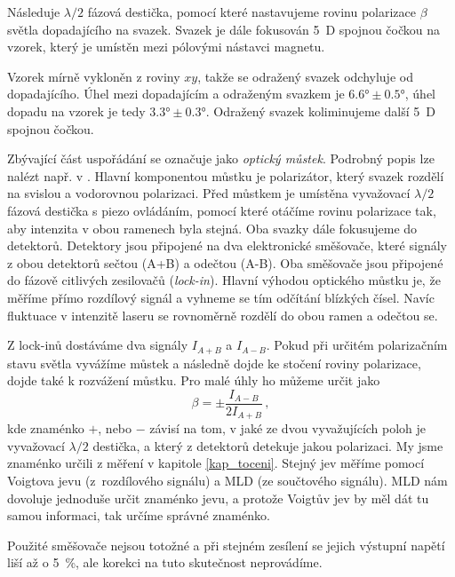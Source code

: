 Následuje $\lambda/2$ fázová destička, pomocí které nastavujeme rovinu polarizace $\beta$ světla dopadajícího na svazek. Svazek je dále fokusován \SI{5}{D} spojnou čočkou na vzorek, který je umístěn mezi pólovými nástavci magnetu. 

Vzorek mírně vykloněn z roviny $xy$, takže se odražený svazek odchyluje od dopadajícího. Úhel mezi dopadajícím a odraženým svazkem je $\ang{6,6}\pm\ang{0,5}$, úhel dopadu na vzorek je tedy $\ang{3,3}\pm\ang{0,3}$.
Odražený svazek koliminujeme další \SI{5}{D} spojnou čočkou.

Zbývající část uspořádání se označuje jako \emph{optický můstek}. Podrobný popis lze nalézt např. v \cite{Rozkotova}. Hlavní komponentou můstku je polarizátor, který svazek rozdělí na svislou a vodorovnou polarizaci. Před můstkem je umístěna vyvažovací $\lambda/2$ fázová destička s piezo ovládáním, pomocí které otáčíme rovinu polarizace tak, aby intenzita v obou ramenech byla stejná. Oba svazky dále fokusujeme do detektorů.
Detektory jsou připojené na dva elektronické směšovače, které signály z obou detektorů sečtou (A+B) a odečtou (A-B). Oba směšovače jsou připojené do fázově citlivých zesilovačů (\emph{lock-in}).
Hlavní výhodou optického můstku je, že měříme přímo rozdílový signál a vyhneme se tím odčítání blízkých čísel. Navíc fluktuace v intenzitě laseru se rovnoměrně rozdělí do obou ramen a odečtou se.

Z lock-inů dostáváme dva signály $I_{A+B}$ a $I_{A-B}$. Pokud při určitém polarizačním stavu světla vyvážíme můstek a následně dojde ke stočení roviny polarizace, dojde také k rozvážení můstku. Pro malé úhly ho můžeme určit jako \cite{Rozkotova}
\begin{equation} \label{e:mustek}
\beta = \pm\frac{I_{A-B}}{2I_{A+B}} \,,
\end{equation}
kde znaménko $+$, nebo $-$ závisí na tom, v jaké ze dvou vyvažujících poloh je vyvažovací $\lambda/2$ destička, a který z detektorů detekuje jakou polarizaci. My jsme znaménko určili z měření v kapitole \ref{kap_toceni}. Stejný jev měříme pomocí Voigtova jevu (z~rozdílového signálu) a MLD (ze součtového signálu). MLD nám dovoluje jednoduše určit znaménko jevu, a protože Voigtův jev by měl dát tu samou informaci, tak určíme správné znaménko.

Použité směšovače nejsou totožné a při stejném zesílení se jejich výstupní napětí liší až o \SI{5}{\percent}, ale korekci na tuto skutečnost neprovádíme.

